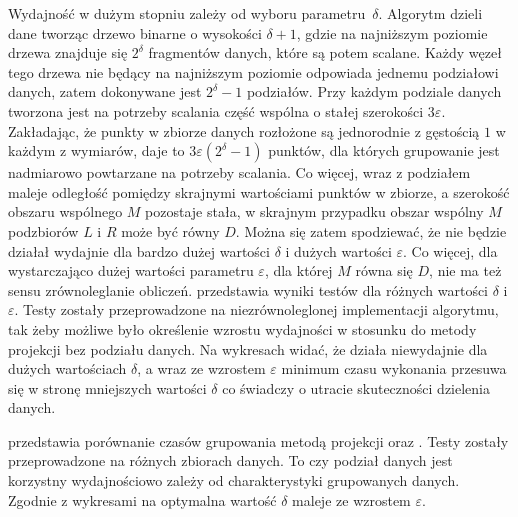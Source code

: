 
Wydajność  w dużym stopniu zależy od wyboru \mbox{parametru $ \delta $}. Algorytm dzieli dane tworząc drzewo binarne o wysokości $ \delta + 1 $, gdzie na najniższym poziomie drzewa znajduje się $ 2^\delta $ fragmentów danych, które są potem scalane. Każdy węzeł tego drzewa nie będący na najniższym poziomie odpowiada jednemu podziałowi danych, zatem dokonywane jest $ 2^\delta - 1 $ podziałów. Przy każdym podziale danych tworzona jest na potrzeby scalania część wspólna o stałej szerokości $ 3\varepsilon $. Zakładając, że punkty w zbiorze danych rozłożone są jednorodnie z gęstością $ 1 $ w każdym z wymiarów, daje to $ 3\varepsilon(2^\delta - 1) $ punktów, dla których grupowanie jest nadmiarowo powtarzane na potrzeby scalania. Co więcej, wraz z podziałem maleje odległość pomiędzy skrajnymi wartościami punktów w zbiorze, a szerokość obszaru wspólnego $ M $ pozostaje stała, w skrajnym przypadku obszar wspólny $ M $ podzbiorów $ L $ i $ R $ może być równy $ D $. Można się zatem spodziewać, że  nie będzie działał wydajnie dla bardzo dużej wartości $ \delta $ i dużych wartości $ \varepsilon $. Co więcej, dla wystarczająco dużej wartości parametru $ \varepsilon $, dla której $ M $ równa się $ D $, nie ma też sensu zrównoleglanie obliczeń.  przedstawia wyniki testów  dla różnych wartości $ \delta $ i $ \varepsilon $. Testy zostały przeprowadzone na niezrównoleglonej implementacji algorytmu, tak żeby możliwe było określenie wzrostu wydajności w stosunku do metody projekcji bez podziału danych. Na wykresach widać, że  działa niewydajnie dla dużych wartościach $ \delta $, a wraz ze wzrostem $ \varepsilon $ minimum czasu wykonania przesuwa się w stronę mniejszych wartości $ \delta $ co świadczy o utracie skuteczności dzielenia danych. \par
{} przedstawia porównanie czasów grupowania metodą projekcji oraz . Testy zostały przeprowadzone na różnych zbiorach danych. To czy podział danych jest korzystny wydajnościowo zależy od charakterystyki grupowanych danych. Zgodnie z wykresami na  optymalna wartość $ \delta $ maleje ze wzrostem $ \varepsilon $.
